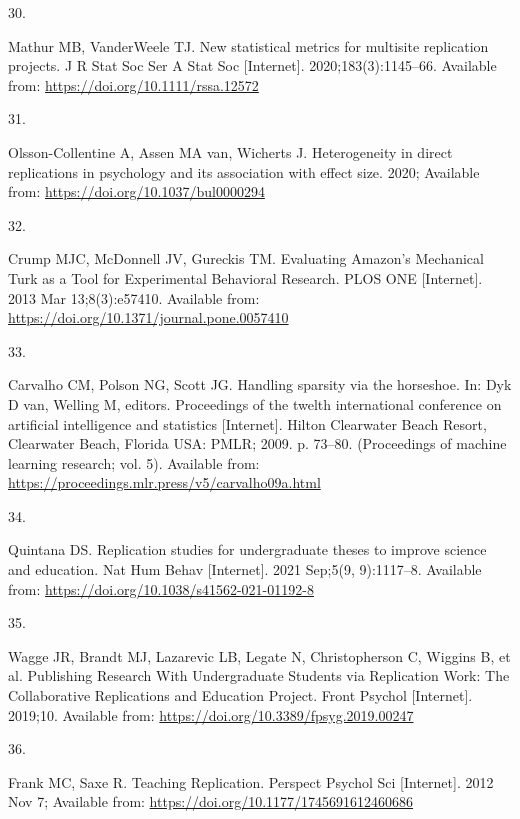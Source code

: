 \documentclass[
  english,
  a4paper,
]{article}
\newlength{\cslhangindent}
\newlength{\csllabelwidth}
\newlength{\cslentryspacingunit} %
\newenvironment{CSLReferences}[2] %
 {%
  \setlength{\parindent}{0pt}
  \ifodd #1
  \let\oldpar\par
  \def\par{\hangindent=\cslhangindent\oldpar}
  \fi
  \setlength{\parskip}{#2\cslentryspacingunit}
 }%
 {}
\newcommand{\CSLLeftMargin}[1]{\parbox[t]{\csllabelwidth}{#1}}
\newcommand{\CSLRightInline}[1]{\parbox[t]{\linewidth - \csllabelwidth}{#1}\break}
\begin{document}
\begin{CSLReferences}{0}{0}
\leavevmode{}%
\CSLLeftMargin{30. }%
\CSLRightInline{Mathur MB, VanderWeele TJ. New statistical metrics for multisite replication projects. J R Stat Soc Ser A Stat Soc {[}Internet{]}. 2020;183(3):1145--66. Available from: \url{https://doi.org/10.1111/rssa.12572}}

\leavevmode{}%
\CSLLeftMargin{31. }%
\CSLRightInline{Olsson-Collentine A, Assen MA van, Wicherts J. Heterogeneity in direct replications in psychology and its association with effect size. 2020; Available from: \url{https://doi.org/10.1037/bul0000294}}

\leavevmode{}%
\CSLLeftMargin{32. }%
\CSLRightInline{Crump MJC, McDonnell JV, Gureckis TM. Evaluating {Amazon}'s {Mechanical Turk} as a {Tool} for {Experimental Behavioral Research}. PLOS ONE {[}Internet{]}. 2013 Mar 13;8(3):e57410. Available from: \url{https://doi.org/10.1371/journal.pone.0057410}}

\leavevmode{}%
\CSLLeftMargin{33. }%
\CSLRightInline{Carvalho CM, Polson NG, Scott JG. Handling sparsity via the horseshoe. In: Dyk D van, Welling M, editors. Proceedings of the twelth international conference on artificial intelligence and statistics {[}Internet{]}. Hilton Clearwater Beach Resort, Clearwater Beach, Florida USA: PMLR; 2009. p. 73--80. (Proceedings of machine learning research; vol. 5). Available from: \url{https://proceedings.mlr.press/v5/carvalho09a.html}}

\leavevmode{}%
\CSLLeftMargin{34. }%
\CSLRightInline{Quintana DS. Replication studies for undergraduate theses to improve science and education. Nat Hum Behav {[}Internet{]}. 2021 Sep;5(9, 9):1117--8. Available from: \url{https://doi.org/10.1038/s41562-021-01192-8}}

\leavevmode{}%
\CSLLeftMargin{35. }%
\CSLRightInline{Wagge JR, Brandt MJ, Lazarevic LB, Legate N, Christopherson C, Wiggins B, et al. Publishing {Research With Undergraduate Students} via {Replication Work}: {The Collaborative Replications} and {Education Project}. Front Psychol {[}Internet{]}. 2019;10. Available from: \url{https://doi.org/10.3389/fpsyg.2019.00247}}

\leavevmode{}%
\CSLLeftMargin{36. }%
\CSLRightInline{Frank MC, Saxe R. Teaching {Replication}. Perspect Psychol Sci {[}Internet{]}. 2012 Nov 7; Available from: \url{https://doi.org/10.1177/1745691612460686}}


\end{CSLReferences}
\end{document}
